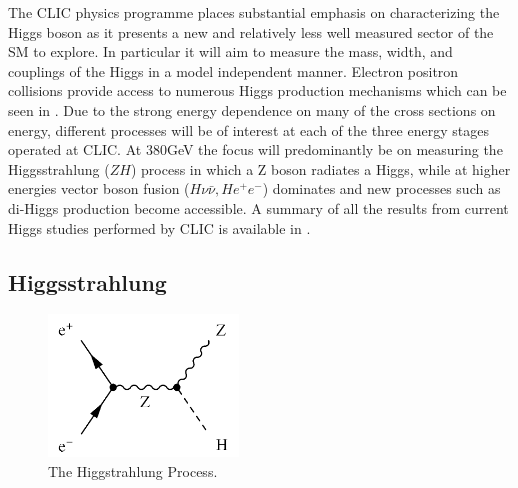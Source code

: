 The CLIC physics programme places substantial emphasis on characterizing the Higgs boson as it presents a new and relatively less well measured sector of the \ac{SM} to explore. In particular it will aim to measure the mass, width, and couplings of the Higgs in a model independent manner. Electron positron collisions provide access to numerous Higgs production mechanisms which can be seen in . Due to the strong energy dependence on many of the cross sections on energy, different processes will be of interest at each of the three energy stages operated at CLIC. At 380GeV the focus will predominantly be on measuring the Higgsstrahlung ($ZH$) process in which a Z boson radiates a Higgs, while at higher energies vector boson fusion ($H\nu\bar{\nu},He^{+}e^{-}$) dominates and new processes such as di-Higgs production become accessible. A summary of all the results from current Higgs studies performed by CLIC is available in \cite{Abramowicz:2016zbo}.

\subsection{Higgsstrahlung}

\begin{figure}
  \centering
  \includegraphics[width=0.45\textwidth,keepaspectratio]{Theory/fig/HiggsStrahlung.png}
  \caption[The Higgstrahlung Process]{The Higgstrahlung Process.}
  \label{fig:higgsstrahlung}
\end{figure}


